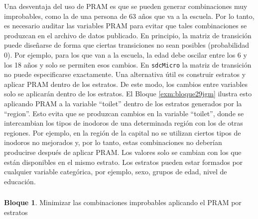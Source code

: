\documentclass[]{book}
\newenvironment{Shaded}{\begin{snugshade}}{\end{snugshade}}
\newcommand{\CommentTok}[1]{\textcolor[rgb]{0.56,0.35,0.01}{\textit{#1}}}
\newcommand{\DataTypeTok}[1]{\textcolor[rgb]{0.13,0.29,0.53}{#1}}
\newcommand{\KeywordTok}[1]{\textcolor[rgb]{0.13,0.29,0.53}{\textbf{#1}}}
\newcommand{\NormalTok}[1]{#1}
\newcommand{\OperatorTok}[1]{\textcolor[rgb]{0.81,0.36,0.00}{\textbf{#1}}}
\newcommand{\StringTok}[1]{\textcolor[rgb]{0.31,0.60,0.02}{#1}}
\theoremstyle{definition}
\theoremstyle{definition}
\newtheorem{example}{Bloque}[chapter]
\theoremstyle{definition}
\theoremstyle{definition}
\theoremstyle{remark}
\begin{document}
Una desventaja del uso de PRAM es que se pueden generar combinaciones muy improbables, como la de una persona de 63 años que va a la escuela. Por lo tanto, es necesario auditar las variables PRAM para evitar que tales combinaciones se produzcan en el archivo de datos publicado. En principio, la matriz de transición puede diseñarse de forma que ciertas transiciones no sean posibles (probabilidad 0). Por ejemplo, para los que van a la escuela, la edad debe oscilar entre los 6 y los 18 años y solo se permiten esos cambios. En \texttt{sdcMicro} la matriz de transición no puede especificarse exactamente. Una alternativa útil es construir estratos y aplicar PRAM dentro de los estratos. De este modo, los cambios entre variables solo se aplicarán dentro de los estratos. El Bloque \ref{exm:bloque29jgm} ilustra esto aplicando PRAM a la variable ``toilet'' dentro de los estratos generados por la ``region''. Esto evita que se produzcan cambios en la variable ``toilet'', donde se intercambian los tipos de inodoros de una determinada región con los de otras regiones. Por ejemplo, en la región de la capital no se utilizan ciertos tipos de inodoros no mejorados y, por lo tanto, estas combinaciones no deberían producirse después de aplicar PRAM. Los valores solo se cambian con los que están disponibles en el mismo estrato. Los estratos pueden estar formados por cualquier variable categórica, por ejemplo, sexo, grupos de edad, nivel de educación.

\hypertarget{section-3}{%
\subsubsection{}\label{section-3}}

\begin{example}
\protect\hypertarget{exm:bloque29jgm}{}{\label{exm:bloque29jgm} }Minimizar las combinaciones improbables aplicando el PRAM por estratos
\end{example}

\begin{Shaded}
\end{Shaded}
\end{document}
